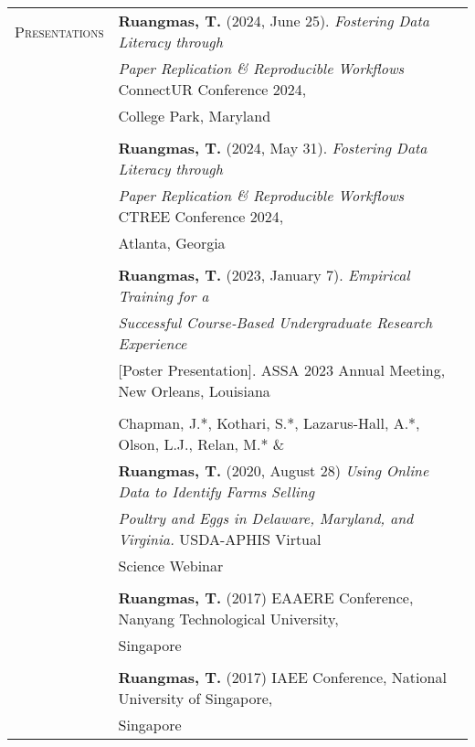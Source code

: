 \documentclass[letterpaper,11pt,oneside]{article}\usepackage[]{graphicx}\usepackage[]{xcolor}
\begin{document}
\newpage
\noindent \begin{tabular}{p{1.2in} l}                           
\textsc{Presentations} & \textbf{Ruangmas, T.} (2024, June 25). \textit{Fostering Data Literacy through} \\
                        & \textit{Paper Replication \& Reproducible Workflows} ConnectUR Conference 2024, \\
                        & College Park, Maryland \\
                        & \\
                        & \textbf{Ruangmas, T.} (2024, May 31). \textit{Fostering Data Literacy through}\\
                        & \textit{Paper Replication \& Reproducible Workflows} CTREE Conference 2024, \\
                        & Atlanta, Georgia\\
                        & \\
                        & \textbf{Ruangmas, T.} (2023, January 7). \textit{Empirical Training for a }\\
                        & \textit{Successful Course-Based Undergraduate Research Experience} \\
                        & [Poster Presentation]. ASSA 2023 Annual Meeting, New Orleans, Louisiana\\
                        & \\
                        & Chapman, J.*, Kothari, S.*, Lazarus-Hall, A.*, Olson, L.J., Relan, M.* \& \\
                        & \textbf{Ruangmas, T.} (2020, August 28) \textit{Using Online Data to Identify Farms Selling}\\
                        & \textit{Poultry and Eggs in Delaware, Maryland, and Virginia.} USDA-APHIS Virtual\\
                        & Science Webinar\\
	                      & \\
                        & \textbf{Ruangmas, T.} (2017) EAAERE Conference, Nanyang Technological University, \\
                        & Singapore \\
	                      & \\
                        & \textbf{Ruangmas, T.} (2017) IAEE Conference, National University of Singapore, \\
                        & Singapore \\

\end{tabular}
\end{document}
